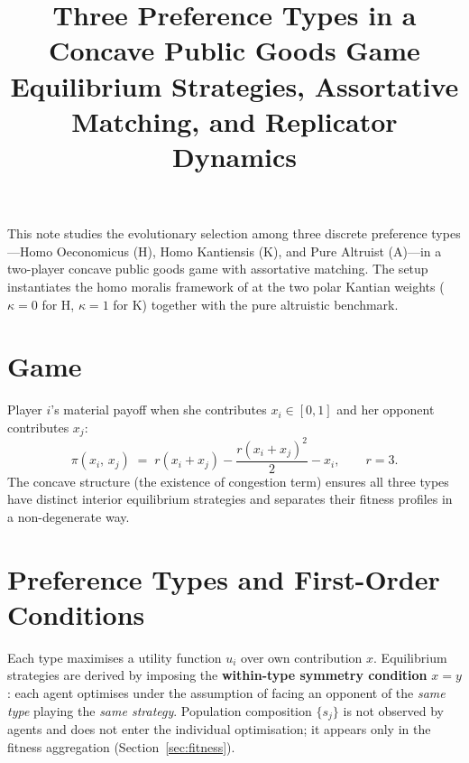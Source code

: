 \documentclass[11pt]{article}
\title{\textbf{Three Preference Types in a Concave Public Goods Game}\\[4pt]
\large Equilibrium Strategies, Assortative Matching, and Replicator Dynamics}
\author{}
\date{}
\begin{document}
\maketitle

\noindent
This note studies the evolutionary selection among three discrete preference types---Homo Oeconomicus (H), Homo Kantiensis (K), and Pure Altruist (A)---in a two-player concave public goods game with assortative matching. The setup instantiates the homo moralis framework of \citet{AlgerWeibull2013} at the two polar Kantian weights ($\kappa = 0$ for H, $\kappa = 1$ for K) together with the pure altruistic benchmark.

\section{Game}

Player $i$'s material payoff when she contributes $x_i \in [0,1]$ and her opponent contributes $x_j$:
\begin{equation}
    \pi(x_i,\, x_j) \;=\; r(x_i + x_j) - \frac{r(x_i+x_j)^2}{2} - x_i, \qquad r = 3.
    \label{eq:pgg}
\end{equation}
The concave structure (the existence of congestion term) ensures all three types have distinct interior equilibrium strategies and separates their fitness profiles in a non-degenerate way.

\section{Preference Types and First-Order Conditions}

Each type maximises a utility function $u_i$ over own contribution $x$. Equilibrium strategies are derived by imposing the \textbf{within-type symmetry condition} $x = y$: each agent optimises under the assumption of facing an opponent of the \emph{same type} playing the \emph{same strategy}. Population composition $\{s_j\}$ is not observed by agents and does not enter the individual optimisation; it appears only in the fitness aggregation (Section~\ref{sec:fitness}).
\end{document}
